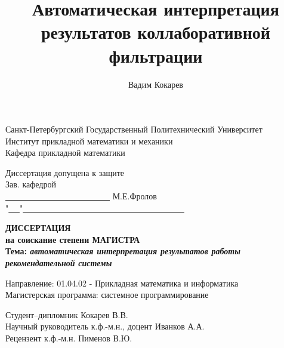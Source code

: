 \documentclass[12pt,a4paper]{report}
\author{Вадим Кокарев}
\title{Автоматическая интерпретация результатов коллаборативной фильтрации}
\begin{document}
\begin{titlepage}
\par

\begin{center}
{\large
Санкт-Петербургский Государственный Политехнический Университет\\
Институт прикладной математики и механики\\
Кафедра прикладной математики\\

\vspace*{0.5cm}

\begin{flushright}
Диссертация допущена к защите\\
Зав. кафедрой\ \ \ \ \ \ \ \ \ \ \ \ \ \ \ \ \ \ \ \ \ \ \ \ \ \ \ \\
\underline{ \ \ \ \ \ \ \ \ \ \ \ \ \ \ \ \ \ \ \ \ \ \ \ \ \ } М.Е.Фролов\\
"\underline{ \ \ }"\underline{ \ \ \ \ \ \ \ \ \ \ \ \ \ \ \ \ \ \ \ \ \ \ \ \ \ \ \ \ \ \ \ \ \ \ \ \ \ \ }
\end{flushright}

\vspace*{2.0cm}

{\Large
  \textbf{
    ДИССЕРТАЦИЯ\\
    на соискание степени МАГИСТРА\\
  }
}
\vspace*{1cm}
\textbf{
  Тема: \emph{автоматическая интерпретация результатов работы рекомендательной системы}\\
}

}

\vspace*{1cm}

\begin{flushleft}
Направление: 01.04.02 - Прикладная математика и информатика\\
Магистерская программа: системное программирование\\
\end{flushleft}

\vspace*{0.2cm}

\begin{flushleft}
Студент--дипломник \hrulefill Кокарев В.В.\\
\vspace*{0.3cm}
Научный руководитель к.ф.-м.н., доцент \hrulefill Иванков А.А.\\
\vspace*{0.3cm}
Рецензент к.ф.-м.н. \hrulefill Пименов В.Ю.\\
\vspace*{0.3cm}
\end{flushleft}
\vspace{0.2em} 


\end{center}
\end{titlepage}
\end{document}
